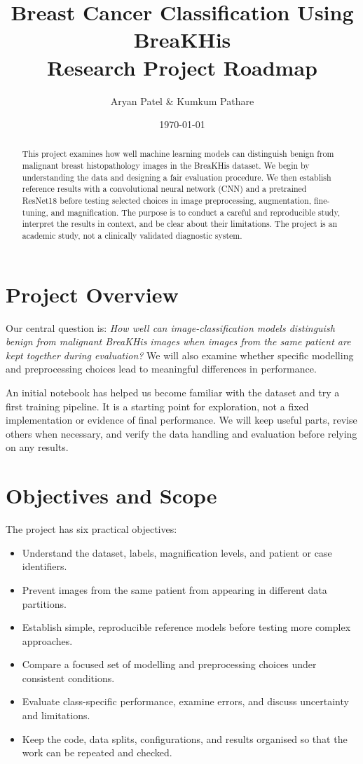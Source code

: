 \documentclass[11pt,a4paper]{article}
\title{\textbf{Breast Cancer Classification Using BreaKHis}\\[0.3em]
\large Research Project Roadmap}
\author{Aryan Patel \& Kumkum Pathare}
\date{\today}
\begin{document}
\maketitle
\thispagestyle{fancy}

\begin{abstract}
This project examines how well machine learning models can distinguish benign from malignant breast histopathology images in the BreaKHis dataset. We begin by understanding the data and designing a fair evaluation procedure. We then establish reference results with a convolutional neural network (CNN) and a pretrained ResNet18 before testing selected choices in image preprocessing, augmentation, fine-tuning, and magnification. The purpose is to conduct a careful and reproducible study, interpret the results in context, and be clear about their limitations. The project is an academic study, not a clinically validated diagnostic system.
\end{abstract}

\section{Project Overview}

Our central question is: \textit{How well can image-classification models distinguish benign from malignant BreaKHis images when images from the same patient are kept together during evaluation?} We will also examine whether specific modelling and preprocessing choices lead to meaningful differences in performance.

An initial notebook has helped us become familiar with the dataset and try a first training pipeline. It is a starting point for exploration, not a fixed implementation or evidence of final performance. We will keep useful parts, revise others when necessary, and verify the data handling and evaluation before relying on any results.

\section{Objectives and Scope}

The project has six practical objectives:
\begin{itemize}
    \item Understand the dataset, labels, magnification levels, and patient or case identifiers.
    \item Prevent images from the same patient from appearing in different data partitions.
    \item Establish simple, reproducible reference models before testing more complex approaches.
    \item Compare a focused set of modelling and preprocessing choices under consistent conditions.
    \item Evaluate class-specific performance, examine errors, and discuss uncertainty and limitations.
    \item Keep the code, data splits, configurations, and results organised so that the work can be repeated and checked.
\end{itemize}
\end{document}
